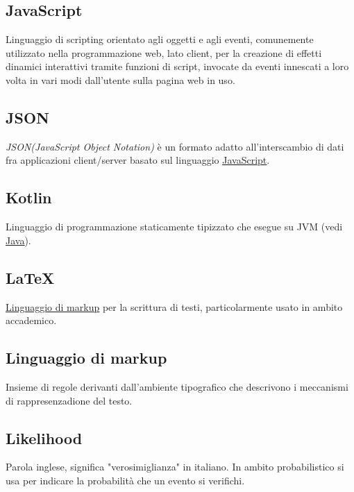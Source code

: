 	\subsection{JavaScript}
	\label{sec:javascript}
	Linguaggio di scripting orientato agli oggetti e agli eventi, comunemente utilizzato nella programmazione web, lato client, per la creazione di effetti dinamici interattivi tramite funzioni di script, invocate da eventi innescati a loro volta in vari modi dall'utente sulla pagina web in uso.

	\subsection{JSON}
	\label{sec:json}
	\emph{JSON(JavaScript Object Notation)} è un formato adatto all'interscambio di dati fra applicazioni client/server basato sul linguaggio \underline{\hyperref[sec:javascript]{JavaScript}}.
	\newpage

	\subsection{Kotlin}
	\label{sec:kotlin}
	Linguaggio di programmazione staticamente tipizzato che esegue su JVM (vedi \underline{\hyperref[sec:java]{Java}}).
	\newpage


	\subsection{LaTeX}
	\label{sec:latex}
	\underline{\hyperref[sec:linguaggiomarkup]{Linguaggio di markup}} per la scrittura di testi, particolarmente usato in ambito accademico.

	\subsection{Linguaggio di markup}
	\label{sec:linguaggiomarkup}
	Insieme di regole derivanti dall'ambiente tipografico che descrivono i meccanismi di rappresenzadione del testo.

	\subsection{Likelihood}
	\label{sec:likelihood}
	Parola inglese, significa "verosimiglianza" in italiano. In ambito probabilistico si usa per indicare la probabilità che un evento si verifichi.

